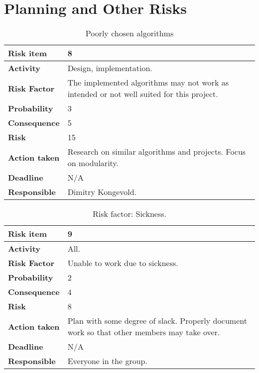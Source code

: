 \section{Planning and Other Risks}

\begin{table}[h!]

\begin{center}
\begin{tabularx}{\textwidth}{| X | X |}
\hline
\textbf{Risk item} & 8 \\
\hline
\textbf{Activity} & Design, implementation.  \\
\hline
\textbf{Risk Factor} & The implemented algorithms may not work as intended or not well suited for this project.\\
\hline
\textbf{Probability} & 3 \\
\hline
\textbf{Consequence} & 5 \\
\hline
\textbf{Risk} & 15 \\
\hline
\textbf{Action taken} & Research on similar algorithms and
projects. Focus on modularity. \\
\hline
\textbf{Deadline} & N/A \\
\hline
\textbf{Responsible} & Dimitry Kongevold. \\
\hline
\end{tabularx}
\caption{Poorly chosen algorithms}
\end{center}
\label{risk_2}
\end{table}




\begin{table}[h!]
\begin{center}
\begin{tabularx}{\textwidth}{| X | X |}
\hline
\textbf{Risk item} & 9 \\
\hline
\textbf{Activity} & All. \\
\hline
\textbf{Risk Factor} & Unable to work due to sickness. \\
\hline
\textbf{Probability} & 2 \\
\hline
\textbf{Consequence} & 4 \\
\hline
\textbf{Risk} & 8 \\
\hline
\textbf{Action taken} & Plan with some degree of slack. \newline Properly document work so that other members may take over. \\
\hline
\textbf{Deadline} & N/A \\
\hline
\textbf{Responsible} & Everyone in the group.\\
\hline
\end{tabularx}
\caption{Risk factor: Sickness.}
\end{center}
\label{risk_6}
\end{table}
